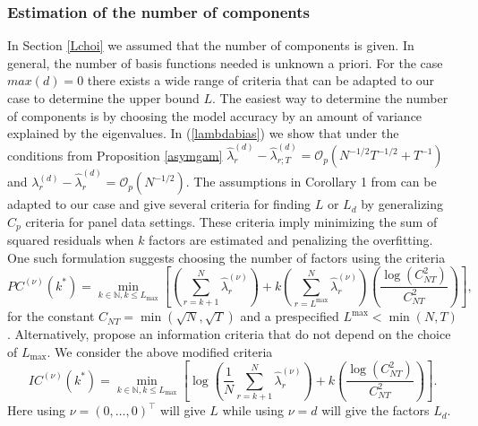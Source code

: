 \subsubsection{Estimation of the number of components}
In Section \ref{Lchoi} we assumed that the number of components is given. In general, the number of basis functions needed is unknown a priori. For the case $max(d)=0$ there exists a wide range of criteria that can be adapted to our case to determine the upper bound $L$. The easiest way to determine the number of components is by choosing the model accuracy by an amount of variance explained by the eigenvalues. %
In (\ref{lambdabias}) we show that under the conditions from Proposition \ref{asymgam} $\hat{\lambda}^{(d)}_r-\hat{\lambda}_{r;T}^{(d)} = \mathcal{O}_p(N^{-1/2}T^{-1/2} + T^{-1})$ and $\lambda^{(d)}_r-\hat{\lambda}_{r}^{(d)} = \mathcal{O}_p(N^{-1/2})$. The assumptions in Corollary 1 from \cite{Bai2002} can be adapted to our case and give several criteria for finding $L$ or $L_d$ by generalizing \cite{Mallows:73} $C_p$ criteria for panel data settings. %
These criteria imply minimizing the sum of squared residuals when $k$ factors are estimated and penalizing the overfitting. 
One such formulation suggests choosing the number of factors using the criteria%
\begin{equation}\label{optk}
PC^{(\nu)}(k^*)=\underset{k\in \mathbb{N}, k\leq L_{\max}}{\operatorname{min}}  \left[ \left(\sum_{r=k+1}^N \hat{\lambda}^{(\nu)}_{r}\right)  + k \left(\sum_{r=L^{\max}}^N \hat{\lambda}^{(\nu)}_{r}\right)  \left( \frac{\log(C^2_{NT})}{C^2_{NT}} \right)  \right],
\end{equation}
for the constant $C_{NT}=\min(\sqrt{N},\sqrt{T})$ and a prespecified $L^{\max}< \min(N,T)$. Alternatively, \cite{Bai2002} propose an information criteria that do not depend on the choice of $L_{\max}$. We consider the above modified criteria
\begin{equation}\label{optIC}
IC^{(\nu)}(k^*)=\underset{k\in \mathbb{N}, k\leq L_{\max}}{\operatorname{min}}  \left[ \log {\left(\frac{1}{N}\sum_{r=k+1}^N \hat{\lambda}^{(\nu)}_{r}\right)}  + k  \left( \frac{\log(C^2_{NT})}{C^2_{NT}} \right)  \right].
\end{equation}
Here using $\nu=(0,\dots,0)^\top$ will give $L$ while using $\nu=d$ will give the factors $L_d$.

